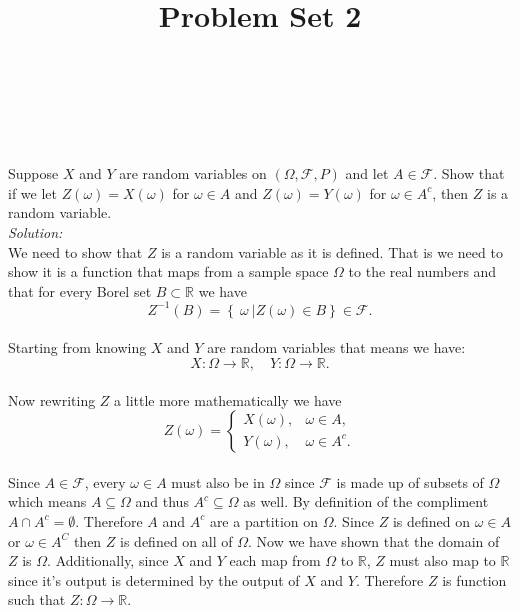 \documentclass[10pt]{amsart}
\begin{document}
\noindent
{} \\
 \\
 \\
\title{Problem Set 2}
\maketitle

 Suppose $X$ and $Y$ are random variables on $(\Omega, \mathcal{F},P)$ and let $A\in \mathcal{F}$. Show that if we let $Z(\omega)=X(\omega)$ for $\omega \in A$ and $Z(\omega)=Y(\omega)$ for $\omega \in A^c$, then $Z$ is a random variable. \\
\textit{Solution:} \\
We need to show that $Z$ is a random variable as it is defined.
That is we need to show it is a function that maps from a sample space $\Omega$ to the real numbers and that for every Borel set $B \subset \mathbb{R}$ we have \\
$$
Z^{-1}(B) = \left\{\: \omega\: | Z(\omega) \in B \right\} \in \mathcal{F}.
$$ \\
Starting from knowing $X$ and $Y$ are random variables that means we have: \\
$$ X: \Omega \rightarrow \mathbb{R}, \quad Y: \Omega \rightarrow \mathbb{R}.$$ \\
Now rewriting $Z$ a little more mathematically we have \\
$$
Z(\omega)= \begin{cases}
 	X(\omega), & \omega \in A, \\
	Y(\omega), & \omega \in A^c.
\end{cases}
$$ \\
Since \( A \in \mathcal{F}\), every $\omega \in A$ must also be in $\Omega$ since \(\mathcal{F}\) is made up of subsets of \(\Omega\) which means $A \subseteq \Omega$ and thus \(A^c \subseteq \Omega\) as well.
By definition of the compliment $A \cap  A^c = \emptyset $.
Therefore $A$ and $A^c$ are a partition on $\Omega$.
Since $Z$ is defined on  $\omega \in A$ or $\omega \in A^C$ then $Z$ is defined on all of $\Omega$.
Now we have shown that the domain of $Z$ is $\Omega$.
Additionally, since $X$ and $Y$ each map from $\Omega$ to $\mathbb{R}$, $Z$ must also map to $\mathbb{R}$ since it's output is determined by the output of $X$ and $Y$.
Therefore $Z$ is function such that $Z: \Omega \rightarrow \mathbb{R}.$ \\
\\
\end{document}

